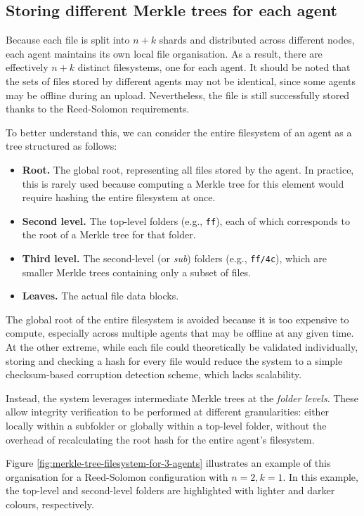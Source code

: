 \subsection{Storing different Merkle trees for each agent}

Because each file is split into $n+k$ shards and distributed across different nodes, each agent maintains its own local file organisation. As a result, there are effectively $n+k$ distinct filesystems, one for each agent. It should be noted that the sets of files stored by different agents may not be identical, since some agents may be offline during an upload. Nevertheless, the file is still successfully stored thanks to the Reed-Solomon requirements.

To better understand this, we can consider the entire filesystem of an agent as a tree structured as follows:
\begin{itemize}
    \item \textbf{Root.} The global root, representing all files stored by the agent. In practice, this is rarely used because computing a Merkle tree for this element would require hashing the entire filesystem at once.
    \item \textbf{Second level.} The top-level folders (e.g., \texttt{ff}), each of which corresponds to the root of a Merkle tree for that folder.
    \item \textbf{Third level.} The second-level (or \emph{sub}) folders (e.g., \texttt{ff/4c}), which are smaller Merkle trees containing only a subset of files.
    \item \textbf{Leaves.} The actual file data blocks.
\end{itemize}

The global root of the entire filesystem is avoided because it is too expensive to compute, especially across multiple agents that may be offline at any given time. At the other extreme, while each file could theoretically be validated individually, storing and checking a hash for every file would reduce the system to a simple checksum-based corruption detection scheme, which lacks scalability.  

Instead, the system leverages intermediate Merkle trees at the \emph{folder levels}. These allow integrity verification to be performed at different granularities: either locally within a subfolder or globally within a top-level folder, without the overhead of recalculating the root hash for the entire agent's filesystem.

Figure \ref{fig:merkle-tree-filesystem-for-3-agents} illustrates an example of this organisation for a Reed-Solomon configuration with $n=2, k=1$. In this example, the top-level and second-level folders are highlighted with lighter and darker colours, respectively.

